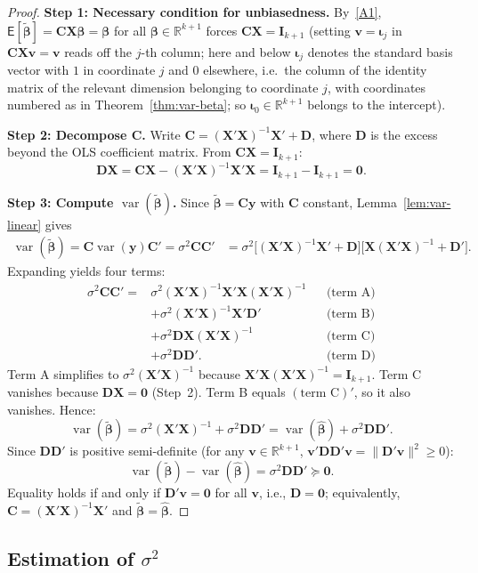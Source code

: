 \documentclass[14pt]{extarticle}
\theoremstyle{plain}
\theoremstyle{definition}
\theoremstyle{remark}
\newcommand\expc{\mathsf{E}}
\DeclareMathOperator\var{var}
\newcommand{\bX}{\mathbf{X}}
\newcommand{\by}{\mathbf{y}}
\def\bb{\boldsymbol{\beta}}
\newcommand{\bI}{\mathbf{I}}
\newcommand{\bzero}{\mathbf{0}}
\newcommand{\bC}{\mathbf{C}}
\newcommand{\bD}{\mathbf{D}}
\newcommand{\bv}{\mathbf{v}}
\newcommand{\Real}{\mathbb{R}}
\begin{document}
\begin{proof}
\textbf{Step 1: Necessary condition for unbiasedness.} By~\ref{A1}, $\expc[\tilde{\bb}] = \bC\bX\bb = \bb$ for all $\bb \in \Real^{k+1}$ forces $\bC\bX = \bI_{k+1}$ (setting $\bv = \boldsymbol\iota_j$ in $\bC\bX\bv = \bv$ reads off the $j$-th column; here and below $\boldsymbol\iota_j$ denotes the standard basis vector with $1$ in coordinate $j$ and $0$ elsewhere, i.e.\ the column of the identity matrix of the relevant dimension belonging to coordinate $j$, with coordinates numbered as in Theorem~\ref{thm:var-beta}; so $\boldsymbol\iota_0 \in \Real^{k+1}$ belongs to the intercept).

\textbf{Step 2: Decompose $\bC$.} Write $\bC = (\bX'\bX)^{-1}\bX' + \bD$, where $\bD$ is the excess beyond the OLS coefficient matrix. From $\bC\bX = \bI_{k+1}$:
\[
\bD\bX = \bC\bX - (\bX'\bX)^{-1}\bX'\bX = \bI_{k+1} - \bI_{k+1} = \bzero.
\]

\textbf{Step 3: Compute $\var(\tilde{\bb})$.} Since $\tilde{\bb} = \bC\by$ with $\bC$ constant, Lemma~\ref{lem:var-linear} gives
\begin{align*}
\var(\tilde{\bb}) = \bC\var(\by)\bC' = \sigma^2\bC\bC' &= \sigma^2\bigl[(\bX'\bX)^{-1}\bX' + \bD\bigr]\bigl[\bX(\bX'\bX)^{-1} + \bD'\bigr].
\end{align*}
Expanding yields four terms:
\begin{align*}
\sigma^2\bC\bC' ={}& \sigma^2(\bX'\bX)^{-1}\bX'\bX(\bX'\bX)^{-1} && \text{(term A)}\\
& + \sigma^2(\bX'\bX)^{-1}\bX'\bD' && \text{(term B)}\\
& + \sigma^2\bD\bX(\bX'\bX)^{-1} && \text{(term C)}\\
& + \sigma^2\bD\bD'. && \text{(term D)}
\end{align*}
Term A simplifies to $\sigma^2(\bX'\bX)^{-1}$ because $\bX'\bX(\bX'\bX)^{-1} = \bI_{k+1}$. Term C vanishes because $\bD\bX = \bzero$ (Step~2). Term B equals $(\text{term C})'$, so it also vanishes. Hence:
\[
\var(\tilde{\bb}) = \sigma^2(\bX'\bX)^{-1} + \sigma^2\bD\bD' = \var(\hat{\bb}) + \sigma^2\bD\bD'.
\]
Since $\bD\bD'$ is positive semi-definite (for any $\bv \in \Real^{k+1}$, $\bv'\bD\bD'\bv = \|\bD'\bv\|^2 \geqslant 0$):
\[
\var(\tilde{\bb}) - \var(\hat{\bb}) = \sigma^2\bD\bD' \succeq \bzero.
\]
Equality holds if and only if $\bD'\bv = \bzero$ for all $\bv$, i.e., $\bD = \bzero$; equivalently, $\bC = (\bX'\bX)^{-1}\bX'$ and $\tilde{\bb} = \hat{\bb}$.
\end{proof}

\subsection{Estimation of \texorpdfstring{$\sigma^2$}{sigma\texttwosuperior}}
\end{document}

